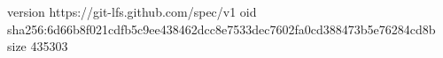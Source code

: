 version https://git-lfs.github.com/spec/v1
oid sha256:6d66b8f021cdfb5c9ee438462dcc8e7533dec7602fa0cd388473b5e76284cd8b
size 435303

